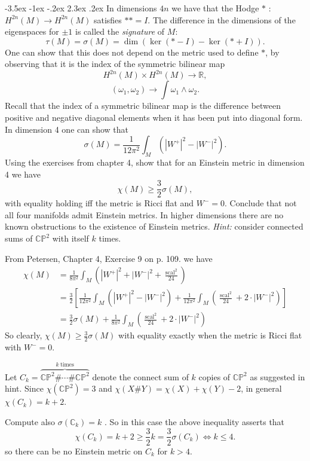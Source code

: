 \documentclass[10pt]{article}
\makeatletter
\renewcommand\section{\@startsection{section}{1}{\z@}%
                                  {-3.5ex \@plus -1ex \@minus -.2ex}%
                                  {2.3ex \@plus.2ex}%
                                  {\normalfont\large\bfseries}}
\newcommand{\C}{\ensuremath{\mathbb{C}}}
\newcommand{\CP}{\ensuremath{\mathbb{CP}}}
\newcommand{\R}{\ensuremath{\mathbb{R}}}
\DeclareMathOperator{\scal}{scal}
\DeclareMathOperator{\2}{II}
\newcommand{\hint}[1]{{\emph{Hint:} #1}} %
\newcommand{\pets}[3]{{Petersen, Chapter #1, Exercise #2 on p. #3.}}
\makeatother
\begin{document}

\section{In dimensions $4n$ we have that the Hodge $*$ : $H^{2n}(M) \to H^{2n}(M)$ satisfies $**=I.$ The difference in the dimensions of the eigenspaces for $\pm 1$ is called the \emph{signature} of $M:$ $$\tau(M) = \sigma(M) = \dim( \ker (*-I) - \ker (*+I)).$$ One can show that this does not depend on the metric used to define $*$, by observing that it is the index of the symmetric bilinear map $$H^{2n}(M) \times H^{2n}(M) \to \R, $$ $$(\omega_1, \omega_2) \to \int \omega_1 \wedge \omega_2.$$ Recall that the index of a symmetric bilinear map is the difference between positive and negative diagonal elements when it has been put into diagonal form. In dimension 4 one can show that $$\sigma(M) = \frac{1}{12 \pi^2} \int_M \left(  \left| W^+ \right|^2 - \left| W^- \right|^2 \right).$$ Using the exercises from chapter 4, show that for an Einstein metric in dimension 4 we have $$\chi(M) \geq \frac{3}{2} \sigma(M),$$ with equality holding iff the metric is Ricci flat and $W^-=0.$ Conclude that not all four manifolds admit Einstein metrics. In higher dimensions there are no known obstructions to the existence of Einstein metrics. \hint{consider connected sums of $\CP^2$ with itself $k$ times.}}

From \pets{4}{9}{109} we have
\begin{align*}
\chi(M) &= \frac{1}{8 \pi^2} \int_M \left( |W^+|^2 + |W^-|^2 + \frac{\scal^2}{24} \right)\\
&=  \frac{3}{2} \left[ \frac{1}{12 \pi^2} \int_M \left( |W^+|^2 - |W^-|^2 \right)+ \frac{1}{12 \pi^2} \int_M \left(  \frac{\scal^2}{24} + 2 \cdot |W^-|^2 \right) \right] \\
&=  \frac{3}{2}  \sigma(M) + \frac{1}{8 \pi^2} \int_M \left(  \frac{\scal^2}{24} + 2 \cdot |W^-|^2 \right)   
\end{align*}
So clearly, $\chi(M) \geq \frac{3}{2}\sigma(M)$ with equality exactly when the metric is Ricci flat with  $W^- =0$.

Let $C_k = \overbrace{\CP^2 \# \cdots \# \CP^2}^{k\ \mathrm{times}}$ denote the connect sum of $k$ copies of $\CP^2$ as suggested in hint. Since $\chi(\CP^2) = 3$ and $\chi( X \# Y) = \chi(X) + \chi(Y) -2 $, in general $\chi(C_k) = k+2$.

Compute also $\sigma(\C_k) = k$ . So in this case the above inequality asserts that
\[\chi(C_k) = k+2 \geq \frac{3}{2} k = \frac{3}{2} \sigma(C_k) \iff k \leq 4.\]
so there can be no Einstein metric on $C_k$ for $k > 4$.
\end{document}
